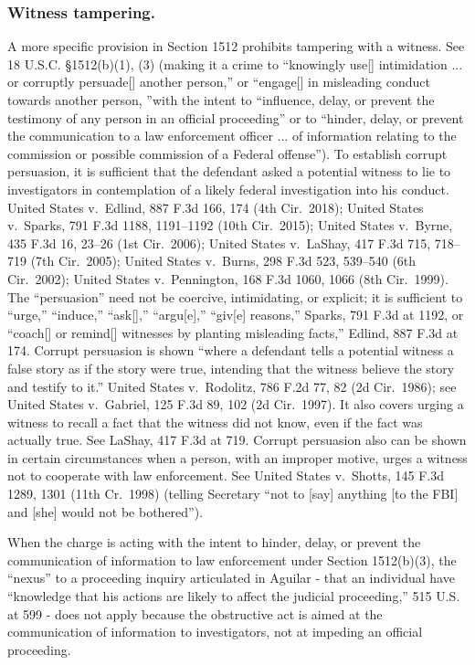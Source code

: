 \subsubsection*{Witness tampering.}
A more specific provision in Section 1512 prohibits tampering with a witness.
See 18 U.S.C. \S 1512(b)(1), (3) (making it a crime to “knowingly use[] intimidation ... or corruptly persuade[] another person,” or “engage[] in misleading conduct towards another person, ”with the intent to “influence, delay, or prevent the testimony of any person in an official proceeding” or to “hinder, delay, or prevent the communication to a law enforcement officer ... of information relating to the commission or possible commission of a Federal offense”).
To establish corrupt persuasion, it is sufficient that the defendant asked a potential witness to lie to investigators in contemplation of a likely federal investigation into his conduct.
United States v.\ Edlind, 887 F.3d 166, 174 (4th Cir.~2018);
United States v.\ Sparks, 791 F.3d 1188, 1191--1192 (10th Cir.~2015);
United States v.\ Byrne, 435 F.3d 16, 23--26 (1st Cir.~2006);
United States v.\ LaShay, 417 F.3d 715, 718--719 (7th Cir.~2005);
United States v.\ Burns, 298 F.3d 523, 539--540 (6th Cir.~2002);
United States v.\ Pennington, 168 F.3d 1060, 1066 (8th Cir.~1999).
The “persuasion” need not be coercive, intimidating, or explicit;
it is sufficient to “urge,” “induce,” “ask[],” “argu[e],” “giv[e] reasons,” Sparks, 791 F.3d at 1192, or “coach[] or remind[] witnesses by planting misleading facts,” Edlind, 887 F.3d at 174.
Corrupt persuasion is shown “where a defendant tells a potential witness a false story as if the story were true, intending that the witness believe the story and testify to it.”
United States v.\ Rodolitz, 786 F.2d 77, 82 (2d Cir.~1986);
see United States v.\ Gabriel, 125 F.3d 89, 102 (2d Cir.~1997).
It also covers urging a witness to recall a fact that the witness did not know, even if the fact was actually true.
See LaShay, 417 F.3d at 719.
Corrupt persuasion also can be shown in certain circumstances when a person, with an improper motive, urges a witness not to cooperate with law enforcement.
See United States v.\ Shotts, 145 F.3d 1289, 1301 (11th Cr.~1998) (telling Secretary “not to [say] anything [to the FBI] and [she] would not be bothered”).

When the charge is acting with the intent to hinder, delay, or prevent the communication of information to law enforcement under Section 1512(b)(3), the “nexus” to a proceeding inquiry articulated in Aguilar - that an individual have “knowledge that his actions are likely to affect the judicial proceeding,” 515 U.S. at 599 - does not apply because the obstructive act is aimed at the communication of information to investigators, not at impeding an official proceeding.


